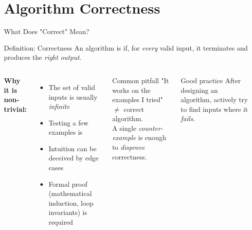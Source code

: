 \documentclass[aspectratio=169]{beamer}
\begin{document}
\section{Algorithm Correctness}

\begin{frame}[shrink=12]{What Does "Correct" Mean?}
  \begin{block}{Definition: Correctness}
    An algorithm is  if, for \emph{every} valid input,
    it terminates and produces the \emph{right output}.
  \end{block}
  \vspace{0.5em}
  \begin{columns}[T]
      \textbf{Why it is non-trivial:}
      \begin{itemize}
        \item The set of valid inputs is usually \emph{infinite}
        \item Testing a few examples is 
        \item Intuition can be deceived by edge cases
        \item Formal proof (mathematical induction, loop invariants)
              is required
      \end{itemize}
      \begin{alertblock}{Common pitfall}
        "It works on the examples I tried" $\neq$ correct algorithm. \\[0.3em]
        A single \emph{counter-example} is enough to \emph{disprove}
        correctness.
      \end{alertblock}
      \begin{exampleblock}{Good practice}
        After designing an algorithm, actively try to find inputs
        where it \emph{fails}.
      \end{exampleblock}
  \end{columns}
\end{frame}
\end{document}

